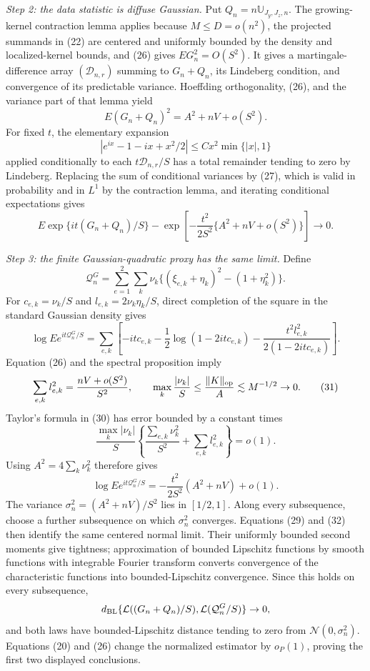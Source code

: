 \emph{Step 2: the data statistic is diffuse Gaussian.}
Put \(Q_n=n\mathbb U_{J_y,J_z,n}\).  The growing-kernel contraction lemma applies because \(M\le D=o(n^2)\), the projected summands in (22) are centered and uniformly bounded by the density and localized-kernel bounds, and (26) gives \(EG_n^2=O(S^2)\).  It gives a martingale-difference array \((\mathcal D_{n,r})\) summing to \(G_n+Q_n\), its Lindeberg condition, and convergence of its predictable variance.  Hoeffding orthogonality, (26), and the variance part of that lemma yield
\[
E(G_n+Q_n)^2=A^2+nV+o(S^2).                                   \tag{27}
\]
For fixed \(t\), the elementary expansion
\[
|e^{ix}-1-ix+x^2/2|\le Cx^2\min\{|x|,1\}                    \tag{28}
\]
applied conditionally to each \(t\mathcal D_{n,r}/S\) has a total remainder tending to zero by Lindeberg.  Replacing the sum of conditional variances by (27), which is valid in probability and in \(L^1\) by the contraction lemma, and iterating conditional expectations gives
\[
E\exp\{it(G_n+Q_n)/S\}
-\exp\!\left[-\frac{t^2}{2S^2}\{A^2+nV+o(S^2)\}\right]\to0. \tag{29}
\]

\emph{Step 3: the finite Gaussian-quadratic proxy has the same limit.}
Define
\[
\mathcal Q_n^G=\sum_{e=1}^2\sum_k\nu_k
\{(\xi_{e,k}+\eta_k)^2-(1+\eta_k^2)\}.
\]
For \(c_{e,k}=\nu_k/S\) and \(l_{e,k}=2\nu_k\eta_k/S\), direct completion of the square in the standard Gaussian density gives
\[
\log Ee^{it\mathcal Q_n^G/S}
=\sum_{e,k}\left[-itc_{e,k}-\frac12\log(1-2itc_{e,k})
-\frac{t^2l_{e,k}^2}{2(1-2itc_{e,k})}\right].                \tag{30}
\]
Equation (26) and the spectral proposition imply
\[
\sum_{e,k}l_{e,k}^2=\frac{nV+o(S^2)}{S^2},
\qquad
\max_k\frac{|\nu_k|}{S}\le\frac{\|K\|_{\rm op}}A
\lesssim M^{-1/2}\to0.                                      \tag{31}
\]
Taylor's formula in (30) has error bounded by a constant times
\[
\frac{\max_k|\nu_k|}{S}
\left\{\frac{\sum_{e,k}\nu_k^2}{S^2}+\sum_{e,k}l_{e,k}^2\right\}=o(1).
\]
Using \(A^2=4\sum_k\nu_k^2\) therefore gives
\[
\log Ee^{it\mathcal Q_n^G/S}
=-\frac{t^2}{2S^2}(A^2+nV)+o(1).                              \tag{32}
\]
The variance \(\sigma_n^2=(A^2+nV)/S^2\) lies in \([1/2,1]\).  Along every subsequence, choose a further subsequence on which \(\sigma_n^2\) converges.  Equations (29) and (32) then identify the same centered normal limit.  Their uniformly bounded second moments give tightness; approximation of bounded Lipschitz functions by smooth functions with integrable Fourier transform converts convergence of the characteristic functions into bounded-Lipschitz convergence.  Since this holds on every subsequence,
\[
d_{\rm BL}\{\mathcal L((G_n+Q_n)/S),\mathcal L(\mathcal Q_n^G/S)\}\to0,
\]
and both laws have bounded-Lipschitz distance tending to zero from \(\mathcal N(0,\sigma_n^2)\).  Equations (20) and (26) change the normalized estimator by \(o_P(1)\), proving the first two displayed conclusions.

